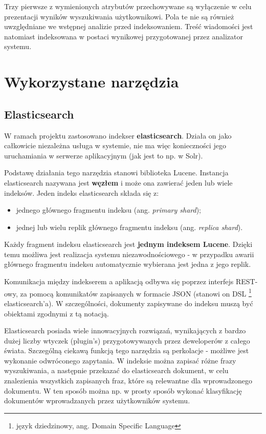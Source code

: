 \documentclass[runningheads]{llncs}
\begin{document}
Trzy pierwsze z wymienionych atrybutów przechowywane są wyłączenie w celu prezentacji wyników wyszukiwania 
użytkownikowi. Pola te nie są również uwzględniane we wstępnej analizie przed indeksowaniem. Treść wiadomości 
jest natomiast indeksowana w postaci wynikowej przygotowanej przez analizator systemu. 

\section{Wykorzystane narzędzia}
\label{sec:wykorzystane-narzedzia}

\subsection{Elasticsearch}

W ramach projektu zastosowano indekser \textbf{elasticsearch}. Działa on jako całkowicie 
niezależna usługa w systemie, nie ma więc konieczności jego uruchamiania w
serwerze aplikacyjnym  (jak jest to np. w Solr).

Podstawę działania tego narzędzia stanowi biblioteka Lucene. Instancja elasticsearch nazywana 
jest \textbf{węzłem} i może ona zawierać jeden lub wiele indeksów.
Jeden indeks elasticsearch składa się z:
\begin{itemize}
  \item jednego głównego fragmentu indeksu (ang. \emph{primary shard});
  \item jednej lub wielu replik głównego fragmentu indeksu (ang. \emph{replica shard}).
\end{itemize}
Każdy fragment indeksu elasticsearch jest \textbf{jednym indeksem Lucene}. Dzięki temu możliwa jest realizacja 
systemu niezawodnościowego - w przypadku awarii głównego fragmentu indeksu automatycznie wybierana jest jedna 
z jego replik. 

Komunikacja  między indekserem
a aplikacją odbywa się poprzez interfejs REST-owy, za pomocą  komunikatów
zapisanych w formacie JSON (stanowi on DSL \footnote{język dziedzinowy, ang. Domain Specific Language} elasticsearch'a).
W szczególności, dokumenty zapisywane  do indeksu muszą być obiektami zgodnymi z tą notacją. 

Elasticsearch posiada wiele innowacyjnych rozwiązań,  wynikających z bardzo
dużej liczby wtyczek (plugin’s) przygotowywanych przez  deweloperów z całego
świata. Szczególną ciekawą funkcją tego narzędzia są perkolacje  -  możliwe jest
wykonanie odwróconego zapytania. W indeksie można zapisać różne  frazy
wyszukiwania, a następnie przekazać do elasticsearch dokument, w  celu
znalezienia wszystkich zapisanych fraz, które  są relewantne dla wprowadzonego
dokumentu. W ten sposób można np. w prosty sposób wykonać  klasyfikację
dokumentów wprowadzanych przez użytkowników systemu.
\end{document}

